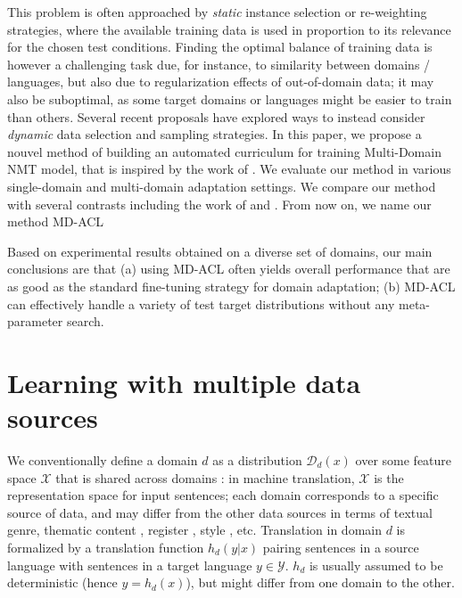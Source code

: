 \documentclass[11pt,a4paper]{article}
\begin{document}
This problem is often approached by \emph{static} instance selection or re-weighting strategies, where the available training data is used in proportion to its relevance for the chosen test conditions. Finding the optimal balance of training data is however a challenging task due, for instance, to similarity between domains / languages, but also due to regularization effects of out-of-domain data; it may also be suboptimal, as some target domains or languages might be easier to train than others. Several recent proposals \cite{Wang17instance,Zhang19curriculum,Kumar19reinforcement,Wang20learning-multi,alex17automated} have explored ways to instead consider \emph{dynamic} data selection and sampling strategies. In this paper, we propose a nouvel method of building an automated curriculum for training Multi-Domain NMT model, that is inspired by the work of \cite{alex17automated}. We evaluate our method in various single-domain and multi-domain adaptation settings. We compare our method with several contrasts including the work of \cite{Zhang19curriculum} and \cite{Wang20balancing}. From now on, we name our method MD-ACL

Based on experimental results obtained on a diverse set of domains, our main conclusions are that (a) using MD-ACL often yields overall performance that are as good as the standard fine-tuning strategy for domain adaptation; (b) MD-ACL can effectively handle a variety of test target distributions without any meta-parameter search.
\section{Learning with multiple data sources} \label{sec:mdmt}

We conventionally define a domain $d$ as a distribution $\mathcal{D}_d(x)$ over some feature space $\mathcal{X}$ that is shared across domains \citep{Pan10asurvey}: in machine translation, $\mathcal{X}$ is the representation space for input sentences; each domain corresponds to a specific source of data, and may differ from the other data sources in terms of textual genre, thematic content \cite{Chen16guided,Zhang16topicinformed}, register \cite{Sennrich16politeness}, style \cite{Niu18multitask}, etc. Translation in domain $d$ is formalized by a translation function $h_d(y|x)$ pairing sentences in a source language with sentences in a target language $y \in \mathcal{Y}$. $h_d$ is usually assumed to be deterministic (hence $y = h_d(x)$), but might differ from one domain to the other.
\end{document}
